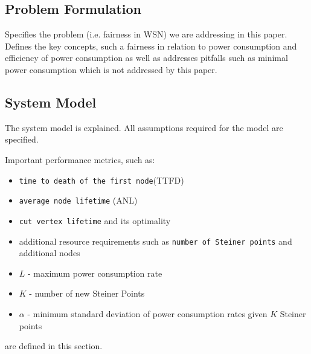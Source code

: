 \subsection{Problem Formulation}
Specifies the problem (i.e. fairness in WSN) we are addressing in this paper. Defines the key concepts, such a fairness in relation to power consumption and efficiency of power consumption as well as addresses pitfalls such as minimal power consumption which is not addressed by this paper.
\subsection{System Model}
The system model is explained. All assumptions required for the model are specified.

Important performance metrics, such as:
\begin{itemize}
\item \texttt{time to death of the first node}(TTFD)
\item \texttt{average node lifetime} (ANL)
\item \texttt{cut vertex lifetime} and its optimality
\item additional resource requirements such as \texttt{number of Steiner points} and additional nodes
\item $L$ - maximum power consumption rate
\item $K$ - number of new Steiner Points
\item $\alpha$ - minimum standard deviation of power consumption rates given $K$ Steiner points
\end{itemize}
are defined in this section.